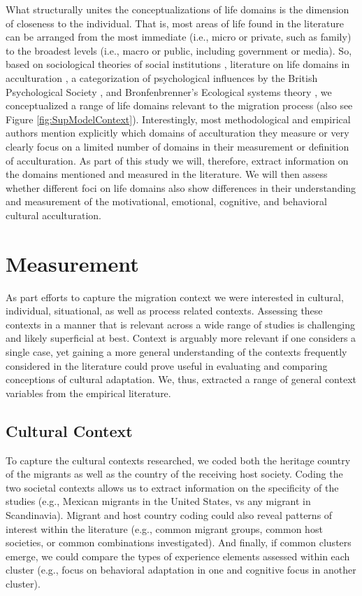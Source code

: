 \documentclass[man, 12pt, a4paper]{apa7}
\begin{document}
What structurally unites the conceptualizations of life domains is the dimension of closeness to the individual. That is, most areas of life found in the literature can be arranged from the most immediate (i.e., micro or private, such as family) to the broadest levels (i.e., macro or public, including government or media). So, based on sociological theories of social institutions \citep{Durkheim1982}, literature on life domains in acculturation \citep{Arends-Toth2006, Arends-Toth2007, Zane2004}, a categorization of psychological influences by the British Psychological Society \citep{Michie2005a}, and Bronfenbrenner's Ecological systems theory \citep{Bronfenbrenner1992}, we conceptualized a range of life domains relevant to the migration process (also see Figure \ref{fig:SupModelContext}). Interestingly, most methodological and empirical authors mention explicitly which domains of acculturation they measure or very clearly focus on a limited number of domains in their measurement or definition of acculturation. As part of this study we will, therefore, extract information on the domains mentioned and measured in the literature. We will then assess whether different foci on life domains also show differences in their understanding and measurement of the motivational, emotional, cognitive, and behavioral cultural acculturation.

\section{Measurement}
As part efforts to capture the migration context we were interested in cultural, individual, situational, as well as process related contexts. Assessing these contexts in a manner that is relevant across a wide range of studies is challenging and likely superficial at best. Context is arguably more relevant if one considers a single case, yet gaining a more general understanding of the contexts frequently considered in the literature could prove useful in evaluating and comparing conceptions of cultural adaptation. We, thus, extracted a range of general context variables from the empirical literature.

\subsection{Cultural Context}
To capture the cultural contexts researched, we coded both the heritage country of the migrants as well as the country of the receiving host society. Coding the two societal contexts allows us to extract information on the specificity of the studies (e.g., Mexican migrants in the United States, vs any migrant in Scandinavia). Migrant and host country coding could also reveal patterns of interest within the literature (e.g., common migrant groups, common host societies, or common combinations investigated). And finally, if common clusters emerge, we could compare the types of experience elements assessed within each cluster (e.g., focus on behavioral adaptation in one and cognitive focus in another cluster). 
\end{document}
